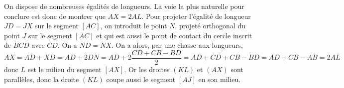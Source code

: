 \begin{sol}
On dispose de nombreuses égalités de longueurs. La voie la plus naturelle pour conclure est donc de montrer que $AX = 2AL$. Pour projeter l'égalité de longueur $JD = JX$ sur le segment $[AC]$, on introduit le point $N$, projeté orthogonal du point $J$ sur le segment $[AC]$ et qui est aussi le point de contact du cercle inscrit de $BCD$ avec $CD$. On a $ND=NX$.
On a alors, par une chasse aux longueurs,
$$AX = AD + XD = AD + 2DN = AD + 2\frac{CD + CB - BD}2 = AD + CD + CB - BD = AD + CB - AB = 2AL$$
donc $L$ est le milieu du segment $[AX]$. Or les droites $(KL)$ et $(AX)$ sont parallèles, donc la droite $(KL)$ coupe aussi le segment $[AJ]$ en son milieu.
\end{sol}